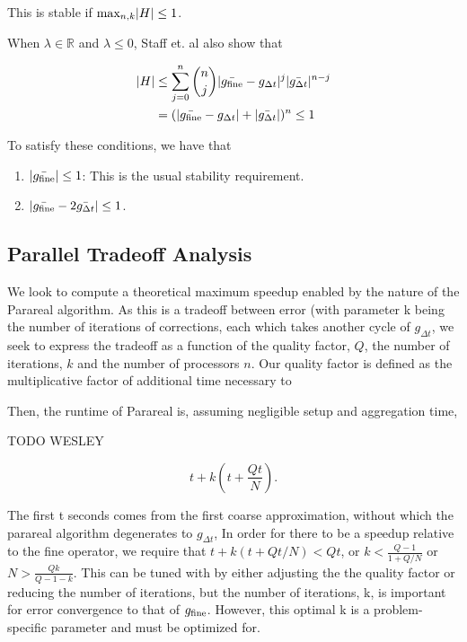 \documentclass[letterpaper,12pt]{article}
\begin{document}
This is stable if $\textnormal{max}_{n, k} |H| \leq 1$. 

When $\lambda \in \mathbb{R}$ and $\lambda \leq 0$, Staff et. al also show that

\[
    \begin{aligned}
    |H| &\leq \sum_{j=0}^n {n \choose j} |\bar{g_{\textnormal{fine}}} -
    g_{\Delta t}|^j |\bar{g_{\Delta t}}|^{n-j} \\
    &= (|\bar{g_{\textnormal{fine}}} - g_{\Delta t}| + |\bar{g_{\Delta
    t}}|)^n \leq 1
    \end{aligned}
\]

To satisfy these conditions, we have that 
\begin{enumerate}
    \item $| \bar{g_{\textnormal{fine}}} | \leq 1$: This is the usual stability
        requirement.
    \item $|\bar{g_{\textnormal{fine}}} - 2 \bar{g_{\Delta t}}| \leq 1$.
\end{enumerate}


\subsection{Parallel Tradeoff Analysis}

We look to compute a theoretical maximum speedup enabled by the nature of the Parareal algorithm.  As this is a tradeoff between error (with parameter k being the number of iterations of corrections, each which takes another cycle of $g_{\Delta t}$, we seek to express the tradeoff as a function of the quality factor, $Q$, the number of iterations, $k$ and the number of processors $n$.  Our quality factor is defined as the multiplicative factor of additional time necessary to 

Then, the runtime of Parareal is, assuming negligible setup and
aggregation time,

TODO WESLEY

\begin{equation}
t + k \left(t + \frac{Qt}{N} \right).
\end{equation}

The first t seconds comes from the first coarse approximation, without which the parareal algorithm degenerates to $g_{\Delta t}$,  In order for there to be a speedup relative to the fine operator, we require
that $t + k(t + Qt/N) < Qt$, or $k < \frac{Q - 1}{1 + Q/N}$ or $N > \frac{Qk}{Q
- 1 - k}$. This can be tuned with by either adjusting the the quality factor or reducing the number of iterations, but the number of iterations, k, is important for error convergence to that of $g_{\textnormal{fine}}$.  However, this optimal k is a problem-specific parameter and must be optimized for.
\end{document}
